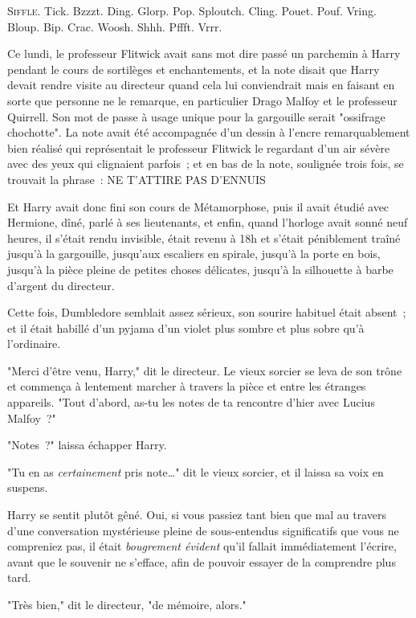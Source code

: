 
\lettrine{S}{iffle}.  Tick. Bzzzt. Ding. Glorp. Pop. Sploutch. Cling. Pouet. Pouf. Vring. Bloup. Bip. Crac. Woosh. Shhh. Pffft. Vrrr.

Ce lundi, le professeur Flitwick avait sans mot dire passé un parchemin à Harry pendant le cours de sortilèges et enchantements, et la note disait que Harry devait rendre visite au directeur quand cela lui conviendrait mais en faisant en sorte que personne ne le remarque, en particulier Drago Malfoy et le professeur Quirrell. Son mot de passe à usage unique pour la gargouille serait "ossifrage chochotte". La note avait été accompagnée d'un dessin à l'encre remarquablement bien réalisé qui représentait le professeur Flitwick le regardant d'un air sévère avec des yeux qui clignaient parfois~; et en bas de la note, soulignée trois fois, se trouvait la phrase~: NE T'ATTIRE PAS D'ENNUIS

Et Harry avait donc fini son cours de Métamorphose, puis il avait étudié avec Hermione, dîné, parlé à ses lieutenants, et enfin, quand l'horloge avait sonné neuf heures, il s'était rendu invisible, était revenu à 18h et s'était péniblement traîné jusqu'à la gargouille, jusqu'aux escaliers en spirale, jusqu'à la porte en bois, jusqu'à la pièce pleine de petites choses délicates, jusqu'à la silhouette à barbe d'argent du directeur.

Cette fois, Dumbledore semblait assez sérieux, son sourire habituel était absent~; et il était habillé d'un pyjama d'un violet plus sombre et plus sobre qu'à l'ordinaire.

"Merci d'être venu, Harry," dit le directeur. Le vieux sorcier se leva de son trône et commença à lentement marcher à travers la pièce et entre les étranges appareils. "Tout d'abord, as-tu les notes de ta rencontre d'hier avec Lucius Malfoy~?"

"Notes~?" laissa échapper Harry.

"Tu en as \emph{certainement} pris note…" dit le vieux sorcier, et il laissa sa voix en suspens.

Harry se sentit plutôt gêné. Oui, si vous passiez tant bien que mal au travers d'une conversation mystérieuse pleine de sous-entendus significatifs que vous ne compreniez pas, il était \emph{bougrement évident} qu'il fallait immédiatement l'écrire, avant que le souvenir ne s'efface, afin de pouvoir essayer de la comprendre plus tard.

"Très bien," dit le directeur, "de mémoire, alors."

